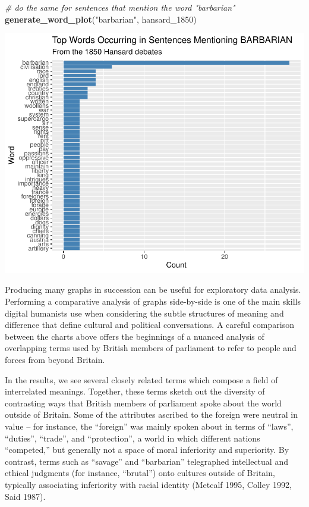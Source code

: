 \documentclass[
]{article}
\newenvironment{Shaded}{\begin{snugshade}}{\end{snugshade}}
\newcommand{\CommentTok}[1]{\textcolor[rgb]{0.56,0.35,0.01}{\textit{#1}}}
\newcommand{\FunctionTok}[1]{\textcolor[rgb]{0.13,0.29,0.53}{\textbf{#1}}}
\newcommand{\NormalTok}[1]{#1}
\newcommand{\StringTok}[1]{\textcolor[rgb]{0.31,0.60,0.02}{#1}}
\begin{document}
\begin{Shaded}
\begin{Highlighting}[]
\CommentTok{\# do the same for sentences that mention the word "barbarian"}
\FunctionTok{generate\_word\_plot}\NormalTok{(}\StringTok{"barbarian"}\NormalTok{, hansard\_1850)}
\end{Highlighting}
\end{Shaded}

\includegraphics[width=0.8\linewidth]{ch1-11.25.2024_files/figure-latex/unnamed-chunk-43-1}

Producing many graphs in succession can be useful for exploratory data
analysis. Performing a comparative analysis of graphs side-by-side is
one of the main skills digital humanists use when considering the subtle
structures of meaning and difference that define cultural and political
conversations. A careful comparison between the charts above offers the
beginnings of a nuanced analysis of overlapping terms used by British
members of parliament to refer to people and forces from beyond Britain.

In the results, we see several closely related terms which compose a
field of interrelated meanings. Together, these terms sketch out the
diversity of contrasting ways that British members of parliament spoke
about the world outside of Britain. Some of the attributes ascribed to
the foreign were neutral in value -- for instance, the ``foreign'' was
mainly spoken about in terms of ``laws'', ``duties'', ``trade'', and
``protection'', a world in which different nations ``competed,'' but
generally not a space of moral inferiority and superiority. By contrast,
terms such as ``savage'' and ``barbarian'' telegraphed intellectual and
ethical judgments (for instance, ``brutal'') onto cultures outside of
Britain, typically associating inferiority with racial identity (Metcalf
1995, Colley 1992, Said 1987).
\end{document}
